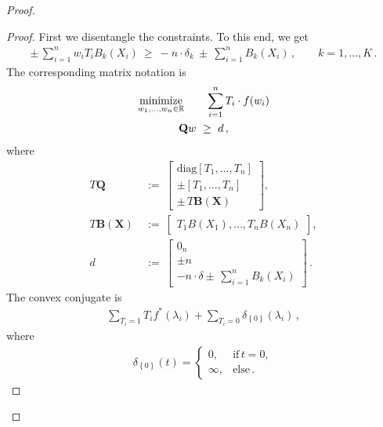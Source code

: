 \begin{proof}
\begin{lemma}
  \end{lemma}
  \begin{proof}
    First we disentangle the constraints.
    To this end, we get
    \begin{gather*}
      \pm\,\sum_{i = 1}^{n} w_i T_i B_k(X_i)
      \ 
      \ge
      \ 
      -n\cdot\delta_k
      \ 
      \pm 
      \ 
      \sum_{i = 1}^{n} B_k(X_i)
      \,,
      \qquad
      k=1,\ldots,K
      \,.
    \end{gather*}
    The corresponding matrix notation is
 \begin{gather*}
    \underset{w_1, \ldots, w_n \in \R}{\mathrm{minimize}}
    \qquad
    \sum_{i = 1}^{n} T_i \cdot f(w_i)
    \\
    \mathbf{Q}w 
    \ 
    \ge
    \ 
    d
    \,,
\end{gather*}
where
\begin{align*}
    T\mathbf{Q}
    &
    \ 
    :=
    \ 
    \begin{bmatrix}
      \mathrm{diag}
      [T_1,\ldots,T_n]
      \\
      \pm
      [T_1,\ldots,T_n]
      \\
      \pm\,T\mathbf{B}(\mathbf{X})
    \end{bmatrix}
    ,
    \\
    T\mathbf{B}(\mathbf{X})
    &
    \ 
    :=
    \ 
    \begin{bmatrix}
      T_1B(X_1), \ldots, T_nB(X_n)
    \end{bmatrix}
    ,
    \\
    d
    &
    \ 
    :=
    \ 
    \begin{bmatrix}
      0_n
      \\
      \pm n
      \\
      -n\cdot\delta 
      \pm\,
      \sum_{i = 1}^{n} B_k(X_i)
    \end{bmatrix}
    \,.
  \end{align*}
The convex conjugate is
\begin{gather*}
  \sum_{T_i=1} T_i f^*(\lambda_i)
  +
  \sum_{T_i=0} 
  \delta_{\left\{ 0 \right\}}(\lambda_i)
  \,,
\end{gather*}
where
\begin{gather*}
  \delta_{\left\{ 0 \right\}}
  (t)
  =
  \begin{cases}
    0,& \text{if}\, t=0,\\
    \infty,& \text{else}\,.
  \end{cases}
\end{gather*}

\end{proof}
\end{proof}
